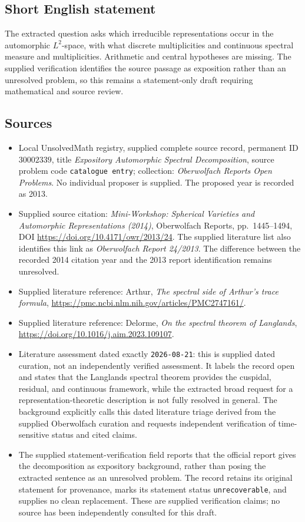 \documentclass[11pt]{article}
\begin{document}
\subsection{Short English statement}
The extracted question asks which irreducible representations occur in the automorphic \(L^2\)-space, with what discrete multiplicities and continuous spectral measure and multiplicities. Arithmetic and central hypotheses are missing. The supplied verification identifies the source passage as exposition rather than an unresolved problem, so this remains a statement-only draft requiring mathematical and source review.
\subsection{Sources}
\begin{itemize}
\item Local UnsolvedMath registry, supplied complete source record, permanent ID \(30002339\), title \emph{Expository Automorphic Spectral Decomposition}, source problem code \texttt{catalogue entry}; collection: \emph{Oberwolfach Reports Open Problems}. No individual proposer is supplied. The proposed year is recorded as 2013.
\item Supplied source citation: \emph{Mini-Workshop: Spherical Varieties and Automorphic Representations (2014)}, Oberwolfach Reports, pp.\ 1445--1494, DOI \url{https://doi.org/10.4171/owr/2013/24}. The supplied literature list also identifies this link as \emph{Oberwolfach Report 24/2013}. The difference between the recorded 2014 citation year and the 2013 report identification remains unresolved.
\item Supplied literature reference: Arthur, \emph{The spectral side of Arthur's trace formula}, \url{https://pmc.ncbi.nlm.nih.gov/articles/PMC2747161/}.
\item Supplied literature reference: Delorme, \emph{On the spectral theorem of Langlands}, \url{https://doi.org/10.1016/j.aim.2023.109107}.
\item Literature assessment dated exactly \texttt{2026-08-21}: this is supplied dated curation, not an independently verified assessment. It labels the record open and states that the Langlands spectral theorem provides the cuspidal, residual, and continuous framework, while the extracted broad request for a representation-theoretic description is not fully resolved in general. The background explicitly calls this dated literature triage derived from the supplied Oberwolfach curation and requests independent verification of time-sensitive status and cited claims.
\item The supplied statement-verification field reports that the official report gives the decomposition as expository background, rather than posing the extracted sentence as an unresolved problem. The record retains its original statement for provenance, marks its statement status \texttt{unrecoverable}, and supplies no clean replacement. These are supplied verification claims; no source has been independently consulted for this draft.
\end{itemize}
\end{document}
